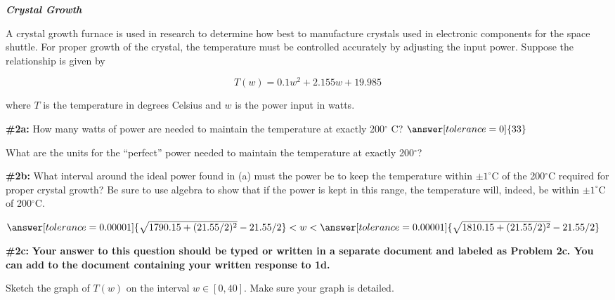 \documentclass[handout,nooutcomes]{ximera}
\begin{document}
\begin{problem}{\textbf{\textit{Crystal Growth}}}

A crystal growth furnace is used in research to determine how best to manufacture crystals used in electronic components for the space shuttle.  For proper growth of the crystal, the temperature must be controlled accurately by adjusting the input power.  Suppose the relationship is given by

\[T(w)= 0.1 w^2 +2.155 w +19.985
\]

where $T$ is the temperature in degrees Celsius and $w$ is the power input in watts.
   \begin{problem}{\textbf{\#2a:}}
   How many watts of power are needed to maintain the temperature at exactly 200$^\circ$ C?
   $\answer[tolerance=0]{33}$
   
   What are the units for the ``perfect'' power needed to maintain the temperature at exactly 200$^\circ$?
    \begin{multipleChoice}
    \end{multipleChoice}
   \end{problem}
   
   \begin{problem}{\textbf{\#2b:}}
   What interval around the ideal power found in (a) must the power be to keep the temperature within $\pm 1^\circ$C  of the 200$^\circ$C required for proper crystal growth? Be sure to use algebra to show that if the power is kept in this range, the temperature will, indeed, be within $\pm 1^\circ$C  of 200$^\circ$C.
   
   $\answer[tolerance=0.00001]{\sqrt{1790.15+(21.55/2)^2}-21.55/2} <w< \answer[tolerance=0.00001]{\sqrt{1810.15+(21.55/2)^2}-21.55/2}$
   
   \end{problem}
   
   \begin{problem}{\textbf{\#2c:}}
   \textbf{Your answer to this question should be typed or written in a separate document and labeled as Problem 2c. You can add to the document containing your written response to 1d.}
   
   Sketch the graph of $T(w)$ on the interval $w\in[0,40]$. Make sure your graph is detailed.
   
    \end{problem}
    

\end{problem}
\end{document}
